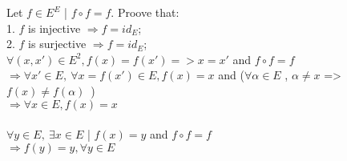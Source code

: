 \documentclass{article}
\begin{document}
\noindent Let $f \in E^E$ | $ f \circ f = f$. Proove that:\\
1. $f$ is injective $\Rightarrow f = id_E$;\\
2. $f$ is surjective $\Rightarrow f = id_E$;\\


\noindent  $\forall (x, x') \in E^2, f(x) = f(x') => x = x'$
and $ f \circ f = f $ \\
$\Rightarrow \forall x' \in E,\ \forall x = f(x') \in E, f(x) = x $ and  ($
\forall \alpha \in E$ , $ \alpha \neq x $ => $ f(x) \neq f(\alpha) $\ )\\
$\Rightarrow \forall x \in E, f(x) = x$\\\\

\noindent $\forall y \in E,\ \exists x \in E $ | $f(x) = y $
and $ f \circ f = f $ \\
$\Rightarrow f(y) = y , \forall y \in E$\\
\end{document}
